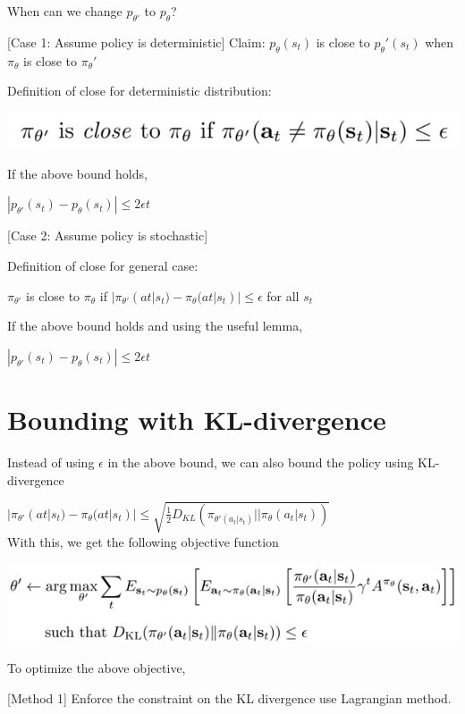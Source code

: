 \documentclass{article}
\begin{document}
When can we change $p_{\theta'}$ to $p_\theta$?

[Case 1: Assume policy is deterministic]
Claim: $p_\theta(s_t)$ is close to $p_\theta'(s_t)$ when $\pi_\theta$ is close to $\pi_\theta'$

Definition of close for deterministic distribution:

\includegraphics[scale=0.5]{bounding_dist1.jpg}

If the above bound holds,

$|p_{\theta'}(s_t) - p_\theta(s_t)| \leq 2\epsilon t$
\newline\newline

[Case 2: Assume policy is stochastic]

Definition of close for general case:

$\pi_{\theta'}$ is close to $\pi_\theta$ if  $|\pi_{\theta'}(at|s_t) - \pi_\theta(at|s_t)| \leq \epsilon$ for all $s_t$

If the above bound holds and using the useful lemma,

$|p_{\theta'}(s_t) - p_\theta(s_t)| \leq 2\epsilon t$

\section{Bounding with KL-divergence}

Instead of using $\epsilon$ in the above bound, we can also bound the policy using KL-divergence 

$|\pi_{\theta'}(at|s_t) - \pi_\theta(at|s_t)| \leq \sqrt{\frac{1}{2}D_{KL}(\pi_{\theta'(a_t|s_t)}||\pi_\theta(a_t|s_t))}$\\

With this, we get the following objective function

\includegraphics[scale=0.5]{kl-div.jpg}

To optimize the above objective, 

[Method 1] Enforce the constraint on the KL divergence use Lagrangian method. 
\end{document}
